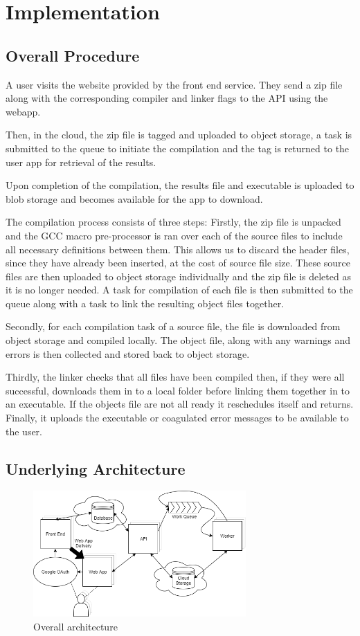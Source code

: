 \documentclass[conference]{IEEEtran}
\begin{document}

\section{Implementation}
\subsection{Overall Procedure}
A user visits the website provided by the front end service. They send a zip file along with the corresponding compiler and linker flags to the API using the webapp.

Then, in the cloud, the zip file is tagged and uploaded to object storage, a task is submitted to the queue to initiate the compilation and the tag is returned to the user app for retrieval of the results.

Upon completion of the compilation, the results file and executable is uploaded to blob storage and becomes available for the app to download.

The compilation process consists of three steps:
Firstly, the zip file is unpacked and the GCC macro pre-processor is ran over each of
the source files to include all necessary definitions between them. This allows us to discard the header files, since they have already been inserted, at the cost of source file size. These source files are then uploaded to object storage individually and the zip file is deleted as it is no longer needed. A task for compilation of each file is then submitted to the queue along with a task to link the resulting object files together. 

Secondly, for each compilation task of a source file, the file is downloaded from object storage and compiled locally. The object file, along with any warnings and errors is then collected and stored back to object storage.

Thirdly, the linker checks that all files have been compiled then, if they were
all successful, downloads them in to a local folder before linking them together
in to an executable. If the objects file are not all ready it reschedules
itself and returns. Finally, it uploads the executable or coagulated error messages to be available to the user.

\subsection{Underlying Architecture}
\begin{figure}[ht] %
    \centering
    \includegraphics[width=3.2in]{OverallArchitecture.png}
    \caption{Overall architecture}
    \label{fig:overview}
\end{figure}
\end{document}
